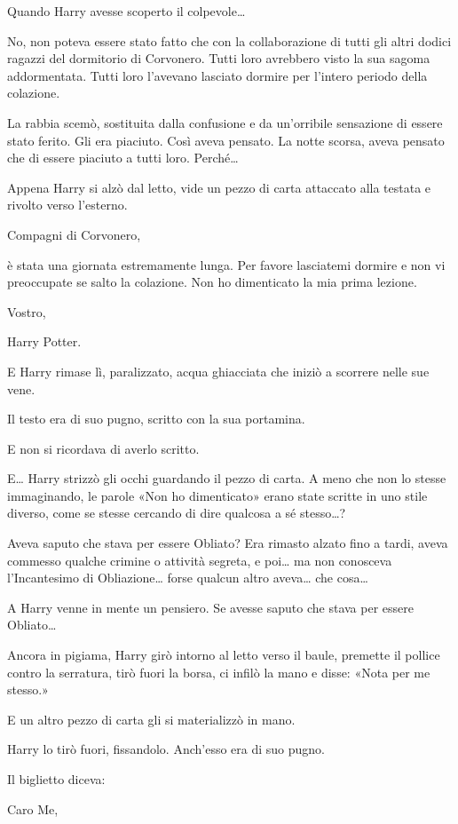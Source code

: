 Quando Harry avesse scoperto il colpevole…

No, non poteva essere stato fatto che con la collaborazione di tutti gli altri dodici ragazzi del dormitorio di Corvonero. Tutti loro avrebbero visto la sua sagoma addormentata. Tutti loro l’avevano lasciato dormire per l’intero periodo della colazione.

La rabbia scemò, sostituita dalla confusione e da un’orribile sensazione di essere stato ferito. Gli era piaciuto. Così aveva pensato. La notte scorsa, aveva pensato che di essere piaciuto a tutti loro. Perché…

Appena Harry si alzò dal letto, vide un pezzo di carta attaccato alla testata e rivolto verso l’esterno.

Compagni di Corvonero,

è stata una giornata estremamente lunga. Per favore lasciatemi dormire e non vi preoccupate se salto la colazione. Non ho dimenticato la mia prima lezione.

Vostro,

Harry Potter.

E Harry rimase lì, paralizzato, acqua ghiacciata che iniziò a scorrere nelle sue vene.

Il testo era di suo pugno, scritto con la sua portamina.

E non si ricordava di averlo scritto.

E… Harry strizzò gli occhi guardando il pezzo di carta. A meno che non lo stesse immaginando, le parole «Non ho dimenticato» erano state scritte in uno stile diverso, come se stesse cercando di dire qualcosa a sé stesso…?

Aveva saputo che stava per essere Obliato? Era rimasto alzato fino a tardi, aveva commesso qualche crimine o attività segreta, e poi… ma non conosceva l’Incantesimo di Obliazione… forse qualcun altro aveva… che cosa…

A Harry venne in mente un pensiero. Se avesse saputo che stava per essere Obliato…

Ancora in pigiama, Harry girò intorno al letto verso il baule, premette il pollice contro la serratura, tirò fuori la borsa, ci infilò la mano e disse: «Nota per me stesso.»

E un altro pezzo di carta gli si materializzò in mano.

Harry lo tirò fuori, fissandolo. Anch’esso era di suo pugno.

Il biglietto diceva:

Caro Me,

